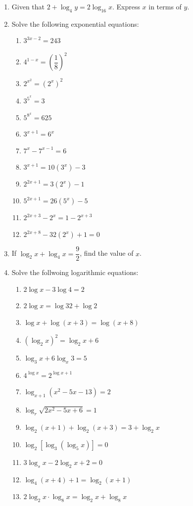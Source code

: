 \documentclass[12pt]{report}
\begin{document}
\begin{multicols}{2}
\begin{enumerate}
    \item Given that $2 + \log_4 y = 2\log_16 x$. Express $x$ in terms of $y$.

    \item Solve the following exponential equations:
          \begin{enumerate}
            \item $3^{3x-2}=243$
            \item $4^{1-x}=\left({\dfrac{1}{8}}\right)^{2}$
            \item $2^{x^{2}}=\left(2^{x}\right)^{2}$
            \item $3^{5^x}=3$
            \item $5^{8^x}=625$
            \item $3^{x+1}=6^{x}$
            \item $7^{x}-7^{x-1}=6$
            \item $3^{x+1}=10\left(3^x\right)-3$
            \item $2^{2x+1}=3\left(2^{x}\right)-1$
            \item $5^{2x+1}=26\left(5^{x}\right)-5$
            \item $2^{2x+3}-2^{x}=1-2^{x+3}$
            \item $2^{2x+8}-32\left(2^{x}\right)+1=0$
          \end{enumerate}

    \item If $\log_2 x + \log_4 x = \dfrac{9}{2}$, find the value of $x$.
    \item Solve the follwoing logarithmic equations:
          \begin{enumerate}
            \item $2\log x-3\log4=2$
            \item $2\log x=\log32+\log2$
            \item $\log x+\log\left(x+3\right)=\log\left(x+8\right)$
            \item $\left(\log_{2}x\right)^{2}=\log_{2}x+6$
            \item $\log_{3}x+6\log_{x}3=5$
            \item $4^{\log x}=2^{\log x+1}$
            \item $\log_{x+1}\left(x^{2}-5x-13\right)=2$
            \item $\log_{r}{\sqrt{2x^{2}-5x+6}}=1$
            \item $\log_{2}(x+1)+\log_{2}(x+3)=3+\log_{2}x$
            \item $\log_{2}\left[\log_{3}\left(\log_{5}x\right)\right]=0$
            \item $3\log_{s}x-2\log_{2}x+2=0$
            \item $\log_{4}(x+4)+1=\log_{2}(x+1)$
            \item $2\log_{2}x\cdot\log_{8}x=\log_{2}x+\log_{8}x$
          \end{enumerate}


\end{enumerate}
\end{multicols}
\end{document}
